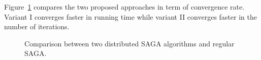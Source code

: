 \documentclass[a4paper,11pt]{article}
\newcommand{\figref}[1]{Figure~\ref{fig:#1}}
\begin{document}
\figref{conv} compares the two proposed approaches in term of convergence
rate. Variant I converges faster in running time while variant II converges
faster in the number of iterations.

\begin{figure}[ht]
	\centering
	\hspace{0pt}
	\caption{Comparison between two distributed SAGA algorithms and regular SAGA.}
	\label{fig:conv}
\end{figure}



\end{document}
